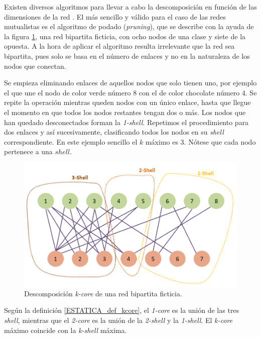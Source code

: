 Existen diversos algoritmos para llevar a cabo la descomposición en función de las dimensiones de la red \cite{montresor2013distributed}. El más sencillo y válido para el caso de las redes mutualistas es el algoritmo de podado (\textit{pruning}), que se describe con la ayuda de la figura \ref{fig:ESTATICA_kcore_decomposition_example}, una red bipartita ficticia, con ocho nodos de una clase y siete de la opuesta. A la hora de aplicar el algoritmo resulta irrelevante que la red sea bipartita, pues solo se basa en el número de enlaces y no en la naturaleza de los nodos que conectan.

Se empieza eliminando enlaces de aquellos nodos que solo tienen uno, por ejemplo el que une el nodo de color verde número 8 con el de color chocolate número 4. Se repite la operación mientras queden nodos con un único enlace, hasta que llegue el momento en que todos los nodos restantes tengan dos o más. Los nodos que han quedado desconectados forman la \textit{1-shell}. Repetimos el procedimiento para dos enlaces y así sucesivamente, clasificando todos los nodos en su \textit{shell} correspondiente. En este ejemplo sencillo el $k$ máximo es 3. Nótese que cada nodo pertenece a una $shell$.

\begin{figure}[h!]
\centering
\includegraphics[scale=0.5]{Figures/ESTATICA_kcore_decomposition_example.png}
\caption{Descomposición \textit{k-core} de una red bipartita ficticia.}
\label{fig:ESTATICA_kcore_decomposition_example}
\end{figure}

Según la definición \ref{ESTATICA_def_kcore}, el  \textit{1-core} es la unión de las tres \textit{shell}, mientras que el \textit{2-core} es la unión de la \textit{2-shell} y la \textit{1-shell}. El \textit{k-core} máximo coincide con la  \textit{k-shell} máxima. 

